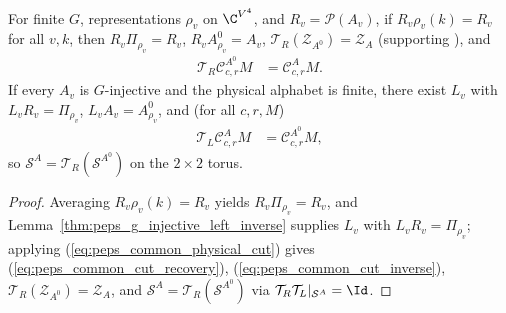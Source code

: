 \begin{lemma}%
    \label{thm:peps_four_cut_common_local_inverse}
    \leanok
    For finite $G$, representations $\rho_v$ on $\C^{V^4}$, and
    $R_v=\mathcal P(A_v)$, if $R_v\rho_v(k)=R_v$ for all $v,k$, then
    $R_v\Pi_{\rho_v}=R_v$, $R_vA^0_{\rho_v}=A_v$,
    $\mathcal T_R(\mathcal Z_{A^0})=\mathcal Z_A$
    (supporting \cite[Theorem~5.5]{Schuch2010PEPS}), and
    \begin{align}
        \mathcal T_R\mathcal C^{A^0}_{c,r}M
         & =\mathcal C^A_{c,r}M.
        \label{eq:peps_common_cut_recovery}
    \end{align}
    If every $A_v$ is $G$-injective and the physical alphabet is finite, there
    exist $L_v$ with $L_vR_v=\Pi_{\rho_v}$, $L_vA_v=A^0_{\rho_v}$, and
    (for all $c,r,M$)
    \begin{align}
        \mathcal T_L\mathcal C^A_{c,r}M
         & =\mathcal C^{A^0}_{c,r}M,
        \label{eq:peps_common_cut_inverse}
    \end{align}
    so $\mathcal S^A=\mathcal T_R(\mathcal S^{A^0})$ on the $2\times2$ torus.
\end{lemma}
\begin{proof}\leanok
    Averaging $R_v\rho_v(k)=R_v$ yields $R_v\Pi_{\rho_v}=R_v$, and
    Lemma~\ref{thm:peps_g_injective_left_inverse} supplies $L_v$ with
    $L_vR_v=\Pi_{\rho_v}$; applying (\ref{eq:peps_common_physical_cut}) gives
    (\ref{eq:peps_common_cut_recovery}), (\ref{eq:peps_common_cut_inverse}),
    $\mathcal T_R(\mathcal Z_{A^0})=\mathcal Z_A$, and
    $\mathcal S^A=\mathcal T_R(\mathcal S^{A^0})$ via
    $\mathcal T_R\mathcal T_L|_{\mathcal S^A}=\Id$.
\end{proof}

